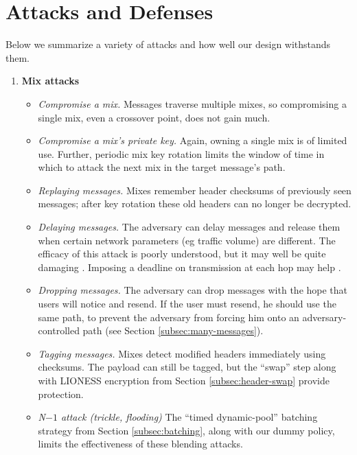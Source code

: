 \documentclass[final,inpress,inline]{ieee}
\begin{document}

\section{Attacks and Defenses}
\label{sec:attacks}

Below we summarize a variety of attacks and how well our design withstands
them.

\begin{enumerate}
\item \textbf{Mix attacks}

\begin{itemize}
\item \emph{Compromise a mix.} Messages traverse multiple mixes, so
compromising a single mix, even a crossover point, does not gain much.
\item \emph{Compromise a mix's private key.} Again, owning a single mix
is of limited use. Further, periodic mix key rotation limits the window
of time in which to attack the next mix in the target message's path.
\item \emph{Replaying messages.}  Mixes remember header checksums of
previously seen messages; after key rotation these old headers can no
longer be decrypted.
\item \emph{Delaying messages.} The adversary can delay messages and
release them when certain network parameters (eg traffic volume) are
different. The efficacy of this attack is poorly understood, but it may
well be quite damaging \cite{batching-taxonomy}. Imposing a deadline on
transmission at each hop may help \cite{mix-acc}.
\item \emph{Dropping messages.} The adversary can drop messages with the
hope that users will notice and resend. If the user must resend, he
should use the same path, to prevent the adversary from forcing him onto
an adversary-controlled path (see Section \ref{subsec:many-messages}).
\item \emph{Tagging messages.} Mixes detect modified headers immediately
using checksums. The payload can still be tagged, but the ``swap'' step
along with LIONESS encryption from Section \ref{subsec:header-swap}
provide protection.
\item \emph{N$-1$ attack (trickle, flooding)} The ``timed dynamic-pool''
batching strategy from Section \ref{subsec:batching}, along with our dummy
policy, limits the effectiveness of these blending attacks.
\end{itemize}


\end{enumerate}
\end{document}
